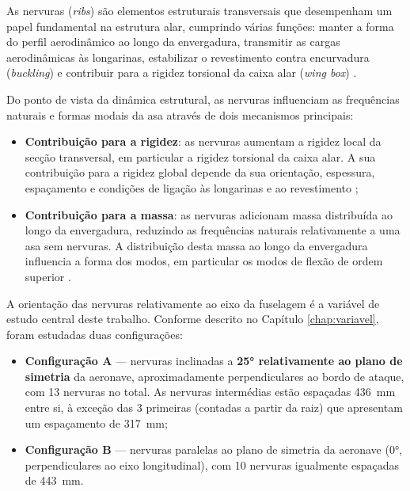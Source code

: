 \documentclass[a4paper,fleqn]{cas-sc}
\begin{document}
As nervuras (\textit{ribs}) são elementos estruturais transversais que desempenham um papel fundamental na estrutura alar, cumprindo várias funções: manter a forma do perfil aerodinâmico ao longo da envergadura, transmitir as cargas aerodinâmicas às longarinas, estabilizar o revestimento contra encurvadura (\textit{buckling}) e contribuir para a rigidez torsional da caixa alar (\textit{wing box}) \cite{Megson2012, Niu1988}.

Do ponto de vista da dinâmica estrutural, as nervuras influenciam as frequências naturais e formas modais da asa através de dois mecanismos principais:

\begin{itemize}
    \item \textbf{Contribuição para a rigidez}: as nervuras aumentam a rigidez local da secção transversal, em particular a rigidez torsional da caixa alar. A sua contribuição para a rigidez global depende da sua orientação, espessura, espaçamento e condições de ligação às longarinas e ao revestimento \cite{Niu1988};

    \item \textbf{Contribuição para a massa}: as nervuras adicionam massa distribuída ao longo da envergadura, reduzindo as frequências naturais relativamente a uma asa sem nervuras. A distribuição desta massa ao longo da envergadura influencia a forma dos modos, em particular os modos de flexão de ordem superior \cite{Craig2006}.
\end{itemize}

A orientação das nervuras relativamente ao eixo da fuselagem é a 
variável de estudo central deste trabalho. Conforme descrito no 
Capítulo \ref{chap:variavel}, foram estudadas duas configurações:

\begin{itemize}
    \item \textbf{Configuração A} --- nervuras inclinadas a \textbf{25° relativamente ao plano de simetria} da aeronave, aproximadamente perpendiculares ao bordo de ataque, com 13 nervuras no total. As nervuras intermédias estão espaçadas \SI{436}{\milli\meter} entre si, à exceção das 3 primeiras (contadas a partir da raiz) que apresentam um espaçamento de \SI{317}{\milli\meter};

    \item \textbf{Configuração B} --- nervuras paralelas ao plano de simetria da aeronave (0°, perpendiculares ao eixo longitudinal), com 10 nervuras igualmente espaçadas de \SI{443}{\milli\meter}.
\end{itemize}
\end{document}
